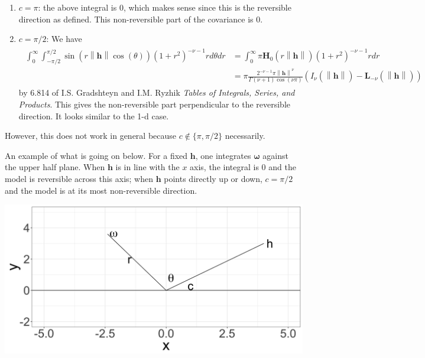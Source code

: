 \documentclass[11pt]{article}
\newcommand{\vint}{\boldsymbol{\omega}}
\begin{document}
 \begin{enumerate}
\item $c = \pi$: the above integral is $0$, which makes sense since this is the reversible direction as defined. This non-reversible part of the covariance is $0$.
\item $c = \pi/2$: We have \begin{align}
\begin{split} \int_0^\infty  \int_{-\pi/2}^{\pi/2} \sin(r\left\lVert \boldsymbol{h}\right\rVert \cos(\theta)) (1 +r^2)^{- \nu - 1} r d\theta dr&= \int_0^\infty \pi\boldsymbol{H}_0(r\left\lVert \boldsymbol{h}\right\rVert)(1 + r^2)^{-\nu - 1} r dr \\
& =\pi\frac{2^{-\nu -1} \pi \left\lVert \boldsymbol{h}\right\rVert^{\nu}}{\Gamma(\nu+1) \cos(\nu \pi)} \left( I_{\nu }(\left\lVert \boldsymbol{h}\right\rVert) - \boldsymbol{L}_{-\nu} (\left\lVert \boldsymbol{h}\right\rVert)\right)\end{split}\label{complete}
\end{align}by 6.814 of I.S. Gradshteyn and I.M. Ryzhik \textit{Tables of Integrals, Series, and Products}. This gives the non-reversible part perpendicular to the reversible direction. It looks similar to the 1-d case.
 \end{enumerate}
 
 However, this does not work in general because $c\notin \{\pi, \pi/2\}$ necessarily. 


An example of what is going on below. For a fixed $\boldsymbol{h}$, one integrates $\vint$ against the upper half plane. When $\boldsymbol{h}$ is in line with the $x$ axis, the integral is $0$ and the model is reversible across this axis; when $\boldsymbol{h}$ points directly up or down, $c= \pi/2$ and the model is at its most non-reversible direction.

\includegraphics[scale = .1]{angle_plot.png}
\end{document}

